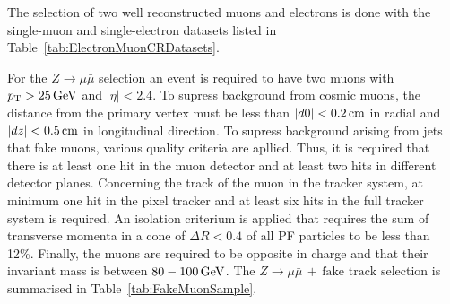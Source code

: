 The selection of two well reconstructed muons and electrons is done with the single-muon and single-electron datasets listed in Table~\ref{tab:ElectronMuonCRDatasets}.
\renewcommand{\arraystretch}{1.5}
\begin{table}[!h]
\centering
\caption{Datasets used for the determination of the fake rate.}
\label{tab:ElectronMuonCRDatasets}
\end{table}  
For the $Z\rightarrow\mu\bar{\mu}$ selection an event is required to have two muons with $p_{\text{T}}>25\,\text{Ge}\kern-0.06667em\text{V}$ and $|\eta|<2.4$.
To supress background from cosmic muons, the distance from the primary vertex must be less than $|d0|<0.2\,\text{cm}$ in radial and $|dz|<0.5\,\text{cm}$ in longitudinal direction.
To supress background arising from jets that fake muons, various quality criteria are apllied. 
Thus, it is required that there is at least one hit in the muon detector and at least two hits in different detector planes.   
Concerning the track of the muon in the tracker system, at minimum one hit in the pixel tracker and at least six hits in the full tracker system is required. 
An isolation criterium is applied that requires the sum of transverse momenta in a cone of $\Delta R<0.4$ of all PF particles to be less than 12\%.
Finally, the muons are required to be opposite in charge and that their invariant mass is between $80-100\,\text{Ge}\kern-0.06667em\text{V}$.
The $Z\rightarrow\mu\bar{\mu}\,+\,\text{fake track}$ selection is summarised in Table~\ref{tab:FakeMuonSample}.
\renewcommand{\arraystretch}{1.4}

